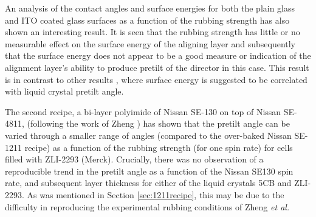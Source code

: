 An analysis of the contact angles and surface energies for both the plain glass and ITO coated glass surfaces as a function of the rubbing strength has also shown an interesting result. It is seen that the rubbing strength has little or no measurable effect on the surface energy of the aligning layer and subsequently that the surface energy does not appear to be a good measure or indication of the alignment layer's ability to produce pretilt of the director in this case. This result is in contrast to other results \cite{Hwang2010}, where surface energy is suggested to be correlated with liquid crystal pretilt angle.

The second recipe, a bi-layer polyimide of Nissan SE-130 on top of Nissan SE-4811, (following the work of Zheng  \cite{Zheng2007}) has shown that the pretilt angle can be varied through a smaller range of angles (compared to the over-baked Nissan SE-1211 recipe) as a function of the rubbing strength (for one spin rate) for cells filled with ZLI-2293 (Merck). Crucially, there was no observation of a reproducible trend in the pretilt angle as a function of the Nissan SE130 spin rate, and subsequent layer thickness for either of the liquid crystals 5CB and ZLI-2293. As was mentioned in Section \ref{sec:1211recipe}, this may be due to the difficulty in reproducing the experimental rubbing conditions of Zheng \textit{et al.}
